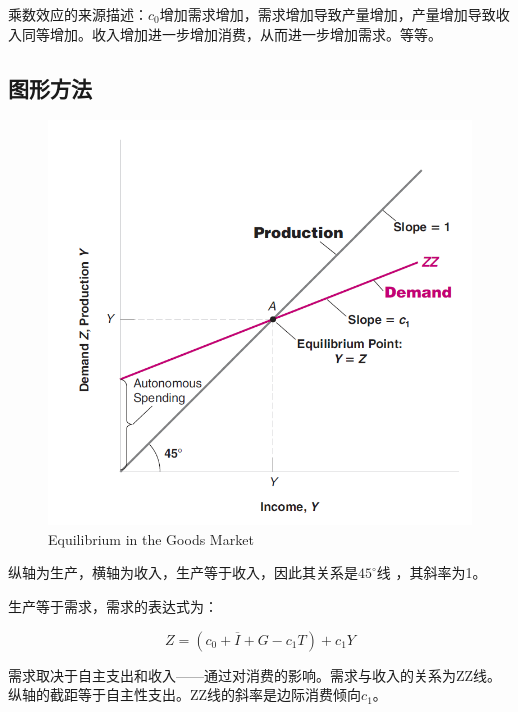 \documentclass{article}
\begin{document}
乘数效应的来源描述：$ c_0 $增加需求增加，需求增加导致产量增加，产量增加导致收入同等增加。收入增加进一步增加消费，从而进一步增加需求。等等。





\subsection{图形方法}

\begin{figure}[H] %
	\centering %
	\includegraphics[width=1\textwidth]{3_1} %
	\caption{Equilibrium in the
		Goods Market} %
	\label{Fig.main2} %
\end{figure}

纵轴为生产，横轴为收入，生产等于收入，因此其关系是$ 45^{\circ} $线
，其斜率为1。

\hspace*{\fill}

生产等于需求，需求的表达式为：

\[
Z=(c_0+\overline{I}+G-c_1T)+c_1Y
\]

需求取决于自主支出和收入——通过对消费的影响。需求与收入的关系为ZZ线。纵轴的截距等于自主性支出。ZZ线的斜率是边际消费倾向$ c_1 $。
\end{document}

